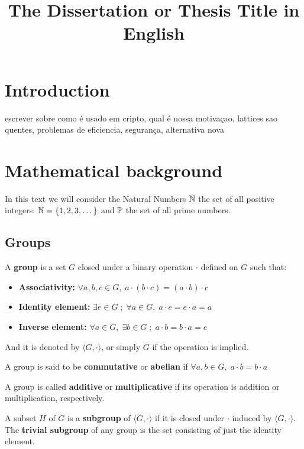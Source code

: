 \documentclass[Ingles]{ic-tese-v3}
\date{}
\title{}
\begin{document}
\title{The Dissertation or Thesis Title in English}
\mestrado
{}
\paginasiniciais


\chapter{Introduction}
\label{sec:org8130758}
escrever sobre como é usado em cripto, qual é nossa motivaçao, lattices sao quentes, problemas de eficiencia, segurança, alternativa nova
\chapter{Mathematical background}
\label{sec:orgffe1404}
In this text we will consider the Natural Numbers \(\N\) the set of all positive integers: \(\N = \{1,2,3,\dots\}\) and \(\P\) the set of all prime numbers. 
\section{Groups}
\label{sec:orgc8e9fc0}

\begin{definition}
  A \textbf{group} is a set $G$ closed under a binary operation $\cdot$ defined on $G$ such
  that:
  \begin{itemize}
  \item \textbf{Associativity: } $\forall a,b,c \in G, \; a\cdot(b\cdot c) = (a\cdot b)\cdot c$
  \item \textbf{Identity element: } $\exists e \in G \; ; \; \forall a \in G, \; a\cdot e = e\cdot a = a$
  \item \textbf{Inverse element: } $\forall a \in G, \; \exists b \in G \; ; \; a\cdot b = b \cdot a = e$
  \end{itemize}
And it is denoted by $\langle G,\cdot\rangle$, or simply $G$ if the operation is implied.
\end{definition}

\begin{definition}
  A group is said to be \textbf{commutative} or \textbf{abelian}
  if $\forall a, b \in G, \; a\cdot b = b\cdot a$
\end{definition}

\noindent
A group is called \textbf{additive} or \textbf{multiplicative} if its
operation is addition or multiplication, respectively.

\begin{definition}
  A subset $H$ of $G$ is a \textbf{subgroup} of $\langle G,\cdot \rangle$ if it is
  closed under $\cdot$ induced by $\langle G,\cdot \rangle$. The \textbf{trivial subgroup} of any
  group is the set consisting of just the identity element.
\end{definition}
\end{document}
